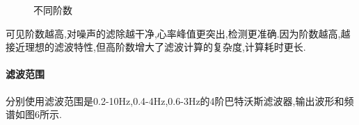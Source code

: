 \documentclass[12pt, a4paper, oneside]{ctexart}
\begin{document}
\begin{figure}[H]
        \caption{不同阶数}
        \label{fig:twopicture} 
      \end{figure}

      可见阶数越高,对噪声的滤除越干净,心率峰值更突出,检测更准确.因为阶数越高,越接近理想的滤波特性,但高阶数增大了滤波计算的复杂度,计算耗时更长.

      \paragraph{滤波范围}
      分别使用滤波范围是0.2-10Hz,0.4-4Hz,0.6-3Hz的4阶巴特沃斯滤波器,输出波形和频谱如图6所示.
\end{document}
